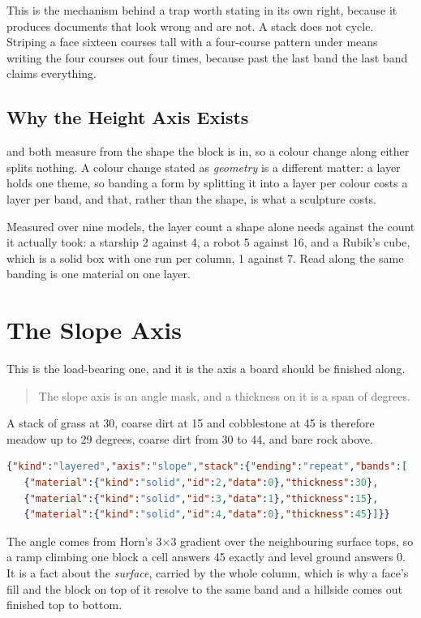 This is the mechanism behind a trap worth stating in its own right, because it
produces documents that look wrong and are not. A stack does not cycle. Striping a
face sixteen courses tall with a four-course pattern under  means writing
the four courses out four times, because past the last band the last band claims
everything.

\subsection{Why the Height Axis Exists}

 and  both measure from the shape the block is in, so a colour
change along either splits nothing. A colour change stated as \emph{geometry} is a
different matter: a layer holds one theme, so banding a form by splitting it into a
layer per colour costs a layer per band, and that, rather than the shape, is what a
sculpture costs.

Measured over nine models, the layer count a shape alone needs against the count it
actually took: a starship 2 against 4, a robot 5 against 16, and a Rubik's cube,
which is a solid box with one run per column, 1 against 7. Read along 
the same banding is one material on one layer.

\section{The Slope Axis}

This is the load-bearing one, and it is the axis a board should be finished along.

\begin{quote}
The slope axis is an angle mask, and a thickness on it is a span of degrees.
\end{quote}

A stack of grass at 30, coarse dirt at 15 and cobblestone at 45 is therefore meadow
up to 29 degrees, coarse dirt from 30 to 44, and bare rock above.

\begin{lstlisting}[language=json]
{"kind":"layered","axis":"slope","stack":{"ending":"repeat","bands":[
   {"material":{"kind":"solid","id":2,"data":0},"thickness":30},
   {"material":{"kind":"solid","id":3,"data":1},"thickness":15},
   {"material":{"kind":"solid","id":4,"data":0},"thickness":45}]}}
\end{lstlisting}

The angle comes from Horn's 3$\times$3 gradient over the neighbouring surface tops,
so a ramp climbing one block a cell answers 45 exactly and level ground answers 0.
It is a fact about the \emph{surface}, carried by the whole column, which is why a
face's fill and the block on top of it resolve to the same band and a hillside comes
out finished top to bottom.

